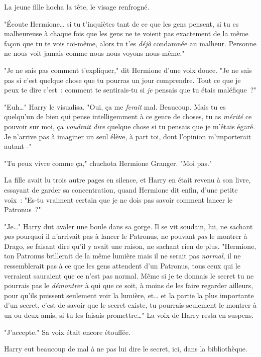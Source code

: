 La jeune fille hocha la tête, le visage renfrogné.

"Écoute Hermione… si tu t'inquiètes tant de ce que les gens pensent, si tu es malheureuse à chaque fois que les gens ne te voient pas exactement de la même façon que tu te vois toi-même, alors tu t'es \emph{déjà} condamnée au malheur. Personne ne nous voit jamais comme nous nous voyons nous-même."

"Je ne sais pas comment t'expliquer," dit Hermione d'une voix douce. "Je ne sais pas si c'est quelque chose que tu pourras un jour comprendre. Tout ce que je peux te dire c'est~: comment te sentirais-tu si \emph{je} pensais que tu étais maléfique~?"

"Euh…" Harry le visualisa. "Oui, ça me \emph{ferait} mal. Beaucoup. Mais tu es quelqu'un de bien qui pense intelligemment à ce genre de choses, tu as \emph{mérité} ce pouvoir sur moi, ça \emph{voudrait dire} quelque chose si tu pensais que je m'étais égaré. Je n'arrive pas à imaginer un seul élève, à part toi, dont l'opinion m'importerait autant -"

"Tu peux vivre comme ça," chuchota Hermione Granger. "Moi pas."

La fille avait lu trois autre pages en silence, et Harry en était revenu à son livre, essayant de garder sa concentration, quand Hermione dit enfin, d'une petite voix~: "Es-tu vraiment certain que je ne dois pas savoir comment lancer le Patronus~?"

"Je…" Harry dut avaler une boule dans sa gorge. Il se vit soudain, lui, ne sachant \emph{pas} pourquoi il n'arrivait pas à lancer le Patronus, ne pouvant \emph{pas} le montrer à Drago, se faisant dire qu'il y avait une raison, ne sachant rien de plus. "Hermione, ton Patronus brillerait de la même lumière mais il ne serait pas \emph{normal}, il ne ressemblerait pas à ce que les gens attendent d'un Patronus, tous ceux qui le verraient sauraient que ce n'est pas normal. Même si je te donnais le secret tu ne pourrais pas le \emph{démontrer} à qui que ce soit, à moins de les faire regarder ailleurs, pour qu'ils puissent seulement voir la lumière, et… et la partie la plus importante d'un secret, c'est de savoir que le secret existe, tu pourrais seulement le montrer à un ou deux amis, si tu les faisais promettre…" La voix de Harry resta en suspens.

"J'accepte." Sa voix était encore étouffée.

Harry eut beaucoup de mal à ne pas lui dire le secret, ici, dans la bibliothèque.

